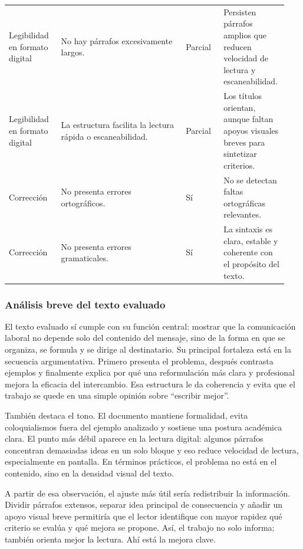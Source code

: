 \begin{longtable}{@{}p{0.18\linewidth}p{0.43\linewidth}p{0.13\linewidth}p{0.20\linewidth}@{}}
Legibilidad en formato digital & No hay párrafos excesivamente largos. & Parcial & Persisten párrafos amplios que reducen velocidad de lectura y escaneabilidad. \\
\addlinespace
Legibilidad en formato digital & La estructura facilita la lectura rápida o escaneabilidad. & Parcial & Los títulos orientan, aunque faltan apoyos visuales breves para sintetizar criterios. \\
\addlinespace
Corrección & No presenta errores ortográficos. & Sí & No se detectan faltas ortográficas relevantes. \\
\addlinespace
Corrección & No presenta errores gramaticales. & Sí & La sintaxis es clara, estable y coherente con el propósito del texto. \\
\bottomrule
\end{longtable}
\endgroup

\subsubsection{Análisis breve del texto evaluado}

El texto evaluado sí cumple con su función central: mostrar que la comunicación laboral no depende solo del contenido del mensaje, sino de la forma en que se organiza, se formula y se dirige al destinatario. Su principal fortaleza está en la secuencia argumentativa. Primero presenta el problema, después contrasta ejemplos y finalmente explica por qué una reformulación más clara y profesional mejora la eficacia del intercambio. Esa estructura le da coherencia y evita que el trabajo se quede en una simple opinión sobre ``escribir mejor''.

También destaca el tono. El documento mantiene formalidad, evita coloquialismos fuera del ejemplo analizado y sostiene una postura académica clara. El punto más débil aparece en la lectura digital: algunos párrafos concentran demasiadas ideas en un solo bloque y eso reduce velocidad de lectura, especialmente en pantalla. En términos prácticos, el problema no está en el contenido, sino en la densidad visual del texto.

A partir de esa observación, el ajuste más útil sería redistribuir la información. Dividir párrafos extensos, separar idea principal de consecuencia y añadir un apoyo visual breve permitiría que el lector identifique con mayor rapidez qué criterio se evalúa y qué mejora se propone. Así, el trabajo no solo informa; también orienta mejor la lectura. Ahí está la mejora clave.

